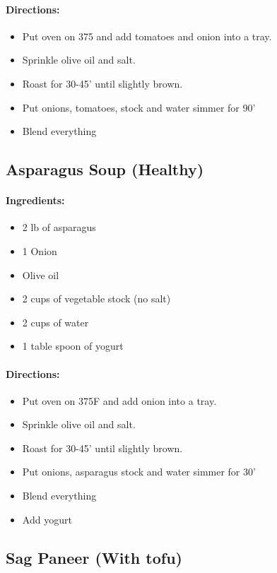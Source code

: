 \documentclass{article}
\begin{document}
\paragraph{Directions:}
\begin{itemize}
	\item Put oven on 375 and add tomatoes and onion into a tray.
	\item Sprinkle olive oil and salt.
	\item Roast for 30-45' until slightly brown.
	\item Put onions, tomatoes, stock and water simmer for 90'
	\item Blend everything
\end{itemize}

\subsection{Asparagus Soup (Healthy)}

\paragraph{Ingredients:}
\begin{itemize}
	\item 2 lb of asparagus
	\item 1 Onion
	\item Olive oil
	\item 2 cups of vegetable stock (no salt)
	\item 2 cups of water
	\item 1 table spoon of yogurt
\end{itemize}

\paragraph{Directions:}
\begin{itemize}
	\item Put oven on 375F and add onion into a tray.
	\item Sprinkle olive oil and salt.
	\item Roast for 30-45' until slightly brown.
	\item Put onions, asparagus stock and water simmer for 30'
	\item Blend everything
	\item Add yogurt
\end{itemize}

\subsection{Sag Paneer (With tofu)}
\end{document}
